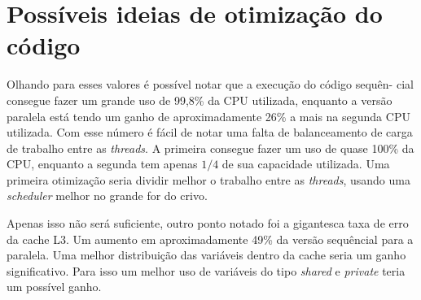 \documentclass{article}
\begin{document}
    \section*{Possíveis ideias de otimização do código}
    Olhando para esses valores é possível notar que a execução do código sequên- cial consegue
    fazer um grande uso de 99,8\% da CPU utilizada, enquanto a versão paralela está tendo um ganho de
    aproximadamente 26\% a mais na segunda CPU utilizada. Com esse número é fácil de notar uma falta de balanceamento
    de carga de trabalho entre as \emph{threads}. A primeira consegue fazer um uso de quase 100\% da CPU,
    enquanto a segunda tem apenas $1/4$ de sua capacidade utilizada. Uma primeira otimização seria dividir melhor
    o trabalho entre as \emph{threads}, usando uma \emph{scheduler} melhor no grande for do crivo.
    
    Apenas isso não será suficiente, outro ponto notado foi a gigantesca taxa de erro
    da cache L3. Um aumento em aproximadamente 49\% da versão sequêncial para a paralela.
    Uma melhor distribuição das variáveis dentro da cache seria um ganho significativo.
    Para isso um melhor uso de variáveis do tipo \emph{shared} e \emph{private} teria 
    um possível ganho.  
\end{document}
